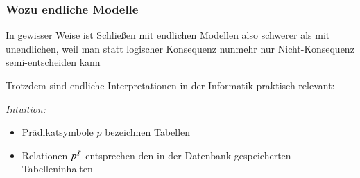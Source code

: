 \documentclass[aspectratio=1610,onlymath]{beamer}
\begin{document}

\begin{frame}\frametitle{Wozu endliche Modelle}

In gewisser Weise ist Schließen mit endlichen Modellen also schwerer als mit unendlichen, weil man statt logischer Konsequenz nunmehr nur Nicht-Konsequenz semi-entscheiden kann
\bigskip

Trotzdem sind endliche Interpretationen in der Informatik praktisch relevant:\medskip

\emph{Intuition:}
\begin{itemize}
\item Prädikatsymbole $p$ bezeichnen Tabellen
\item Relationen $p^{\mathcal{I}}$ entsprechen den in der Datenbank gespeicherten Tabelleninhalten
\end{itemize}

\end{frame}
\end{document}
